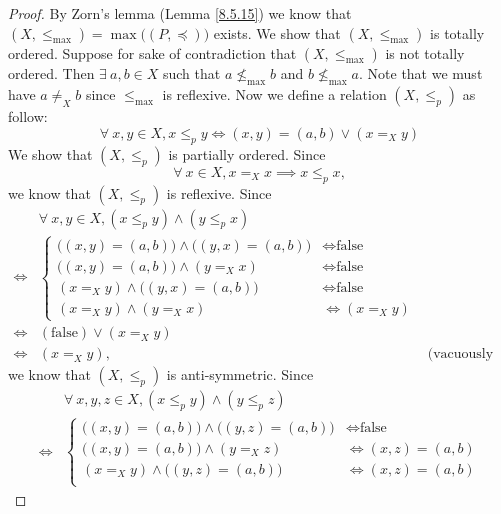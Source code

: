 \begin{proof}
    By Zorn's lemma (Lemma \ref{8.5.15}) we know that \((X, \leq_{\max}) = \max\big((P, \preceq)\big)\) exists.
    We show that \((X, \leq_{\max})\) is totally ordered.
    Suppose for sake of contradiction that \((X, \leq_{\max})\) is not totally ordered.
    Then \(\exists\ a, b \in X\) such that \(a \not\leq_{\max} b\) and \(b \not\leq_{\max} a\).
    Note that we must have \(a \neq_X b\) since \(\leq_{\max}\) is reflexive.
    Now we define a relation \((X, \leq_p)\) as follow:
    \[
        \forall\ x, y \in X, x \leq_p y \iff (x, y) = (a, b) \lor (x =_X y)
    \]
    We show that \((X, \leq_p)\) is partially ordered.
    Since
    \[
        \forall\ x \in X, x =_X x \implies x \leq_p x,
    \]
    we know that \((X, \leq_p)\) is reflexive.
    Since
    \begin{align*}
             & \forall\ x, y \in X, (x \leq_p y) \land (y \leq_p x)                           \\
        \iff & \begin{cases}
            \big((x, y) = (a, b)\big) \land \big((y, x) = (a, b)\big) & \iff \text{false} \\
            \big((x, y) = (a, b)\big) \land (y =_X x)                 & \iff \text{false} \\
            (x =_X y) \land \big((y, x) = (a, b)\big)                 & \iff \text{false} \\
            (x =_X y) \land (y =_X x)                                 & \iff (x =_X y)
        \end{cases}                                                     \\
        \iff & (\text{false}) \lor (x =_X y)                                                  \\
        \iff & (x =_X y),                                           & \text{(vacuously true)}
    \end{align*}
    we know that \((X, \leq_p)\) is anti-symmetric.
    Since
    \begin{align*}
             & \forall\ x, y, z \in X, (x \leq_p y) \land (y \leq_p z)                                \\
        \iff & \begin{cases}
            \big((x, y) = (a, b)\big) \land \big((y, z) = (a, b)\big) & \iff \text{false}    \\
            \big((x, y) = (a, b)\big) \land (y =_X z)                 & \iff (x, z) = (a, b) \\
            (x =_X y) \land \big((y, z) = (a, b)\big)                 & \iff (x, z) = (a, b) \\

\end{cases}
\end{align*}
\end{proof}
